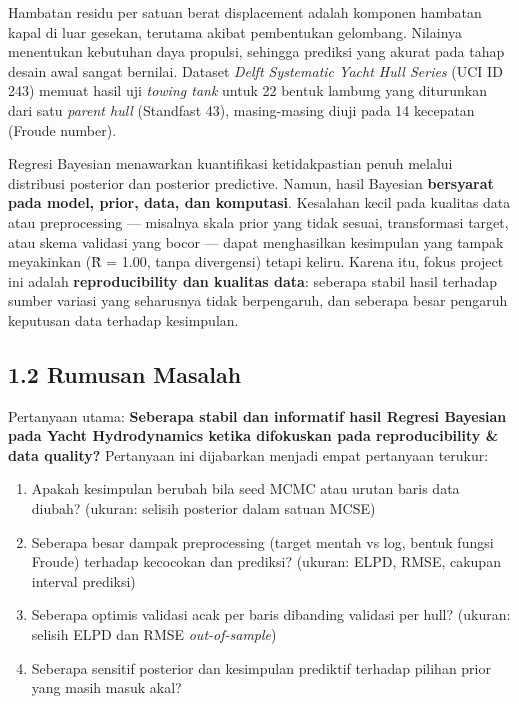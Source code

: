 \documentclass[
]{article}
\providecommand{\tightlist}{%
  \setlength{\itemsep}{0pt}\setlength{\parskip}{0pt}}
\begin{document}
Hambatan residu per satuan berat displacement adalah komponen hambatan
kapal di luar gesekan, terutama akibat pembentukan gelombang. Nilainya
menentukan kebutuhan daya propulsi, sehingga prediksi yang akurat pada
tahap desain awal sangat bernilai. Dataset \emph{Delft Systematic Yacht
Hull Series} (UCI ID 243) memuat hasil uji \emph{towing tank} untuk 22
bentuk lambung yang diturunkan dari satu \emph{parent hull} (Standfast
43), masing-masing diuji pada 14 kecepatan (Froude number).

Regresi Bayesian menawarkan kuantifikasi ketidakpastian penuh melalui
distribusi posterior dan posterior predictive. Namun, hasil Bayesian
\textbf{bersyarat pada model, prior, data, dan komputasi}. Kesalahan
kecil pada kualitas data atau preprocessing --- misalnya skala prior
yang tidak sesuai, transformasi target, atau skema validasi yang bocor
--- dapat menghasilkan kesimpulan yang tampak meyakinkan (R̂ = 1.00,
tanpa divergensi) tetapi keliru. Karena itu, fokus project ini adalah
\textbf{reproducibility dan kualitas data}: seberapa stabil hasil
terhadap sumber variasi yang seharusnya tidak berpengaruh, dan seberapa
besar pengaruh keputusan data terhadap kesimpulan.

\subsection{1.2 Rumusan Masalah}\label{rumusan-masalah}

Pertanyaan utama: \textbf{Seberapa stabil dan informatif hasil Regresi
Bayesian pada Yacht Hydrodynamics ketika difokuskan pada reproducibility
\& data quality?} Pertanyaan ini dijabarkan menjadi empat pertanyaan
terukur:

\begin{enumerate}
\def\labelenumi{\arabic{enumi}.}
\tightlist
\item
  Apakah kesimpulan berubah bila seed MCMC atau urutan baris data
  diubah? (ukuran: selisih posterior dalam satuan MCSE)
\item
  Seberapa besar dampak preprocessing (target mentah vs log, bentuk
  fungsi Froude) terhadap kecocokan dan prediksi? (ukuran: ELPD, RMSE,
  cakupan interval prediksi)
\item
  Seberapa optimis validasi acak per baris dibanding validasi per hull?
  (ukuran: selisih ELPD dan RMSE \emph{out-of-sample})
\item
  Seberapa sensitif posterior dan kesimpulan prediktif terhadap pilihan
  prior yang masih masuk akal?
\end{enumerate}
\end{document}
